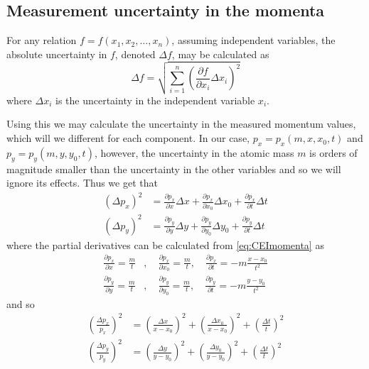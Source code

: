 \subsection{Measurement uncertainty in the momenta}
For any relation $f = f(x_1, x_2, \dots, x_n)$, assuming independent variables, the absolute uncertainty in $f$, denoted $\Delta f$, may be calculated as
\begin{equation}
\Delta f = \sqrt{\sum_{i=1}^{n} \left( \frac{\partial f}{\partial x_i} \Delta x_i \right)^2}
\end{equation}
where $\Delta x_i$ is the uncertainty in the independent variable $x_i$.

Using this we may calculate the uncertainty in the measured momentum values, which will we different for each component. In our case, $p_x = p_x(m,x,x_0,t)$ and $p_y = p_y(m,y,y_0,t)$, however, the uncertainty in the atomic mass $m$ is orders of magnitude smaller than the uncertainty in the other variables and so we will ignore its effects. Thus we get that
\begin{subequations}
  \begin{align}
  (\Delta p_x)^2 &= \frac{\partial p_x}{\partial x}\Delta x + \frac{\partial p_x}{\partial x_0}\Delta x_0 + \frac{\partial p_x}{\partial t}\Delta t \\
  (\Delta p_y)^2 &= \frac{\partial p_y}{\partial y}\Delta y + \frac{\partial p_y}{\partial y_0}\Delta y_0 + \frac{\partial p_y}{\partial t}\Delta t
  \end{align}
\end{subequations}
where the partial derivatives can be calculated from \eqref{eq:CEImomenta} as
\begin{subequations}
  \begin{align}
  \frac{\partial p_x}{\partial x} = \frac{m}{t} &,\quad \frac{\partial p_x}{\partial x_0} = \frac{m}{t} ,\quad \frac{\partial p_x}{\partial t} = -m\frac{x-x_0}{t^2}\\
  \frac{\partial p_y}{\partial y} = \frac{m}{t} &,\quad \frac{\partial p_y}{\partial y_0} = \frac{m}{t} ,\quad \frac{\partial p_y}{\partial t} = -m\frac{y-y_0}{t^2}
  \end{align}
\end{subequations}
and so
\begin{subequations}
  \begin{align}
  \left( \frac{\Delta p_x}{p_x} \right)^2 &= \left( \frac{\Delta x}{x - x_0} \right)^2 + \left( \frac{\Delta x_0}{x - x_0} \right)^2 + \left( \frac{\Delta t}{t} \right)^2 \\
  \left( \frac{\Delta p_y}{p_y} \right)^2 &= \left( \frac{\Delta y}{y - y_0} \right)^2 + \left( \frac{\Delta y_0}{y - y_0} \right)^2 + \left( \frac{\Delta t}{t} \right)^2
  \end{align}
\end{subequations}

